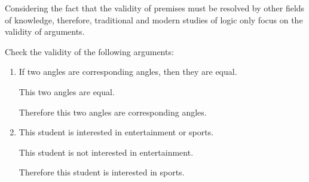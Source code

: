 \documentclass{report}
\newcounter{example}
\begin{document}
Considering the fact that the validity of premises must be resolved by other
fields of knowledge, therefore, traditional and modern studies of logic only
focus on the validity of arguments.

\begin{example}
    \item Check the validity of the following arguments:
    \begin{enumerate}[label=(\alph*), leftmargin=*]
        \item If two angles are corresponding angles, then they are equal.

              This two angles are equal.

              Therefore this two angles are corresponding angles.

        \item This student is interested in entertainment or sports.

              This student is not interested in entertainment.

              Therefore this student is interested in sports.
    \end{enumerate}
\end{example}
\end{document}
